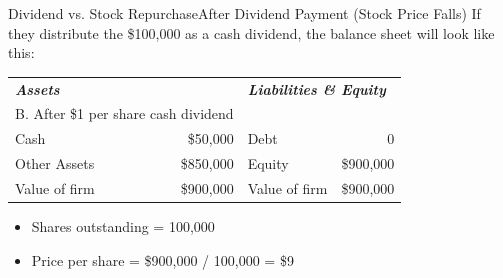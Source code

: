 \begin{frame}{Dividend vs. Stock Repurchase}{After Dividend Payment (Stock Price Falls)}
	If they distribute the \$100,000 as a cash dividend, the balance sheet will look like this:
	\begin{table}[]
		\begin{tabular}{@{}lrlr@{}}
			\multicolumn{2}{l}{\textit{\textbf{Assets}}} & \multicolumn{2}{l}{\textit{\textbf{Liabilities   \& Equity}}} \\
			\multicolumn{2}{l}{B. After \$1 per share cash dividend} &  & \multicolumn{1}{l}{} \\ \midrule
			Cash & \multicolumn{1}{r|}{\$50,000} & Debt & 0 \\
			Other Assets & \multicolumn{1}{r|}{\$850,000} & Equity & \$900,000 \\
			Value of firm & \multicolumn{1}{r|}{\$900,000} & Value of firm & \$900,000 \\ \bottomrule
		\end{tabular}
	\end{table}
\begin{itemize}
\item Shares outstanding = 100,000
\item Price per share = \$900,000 / 100,000 = \$9
\end{itemize}
\end{frame}

